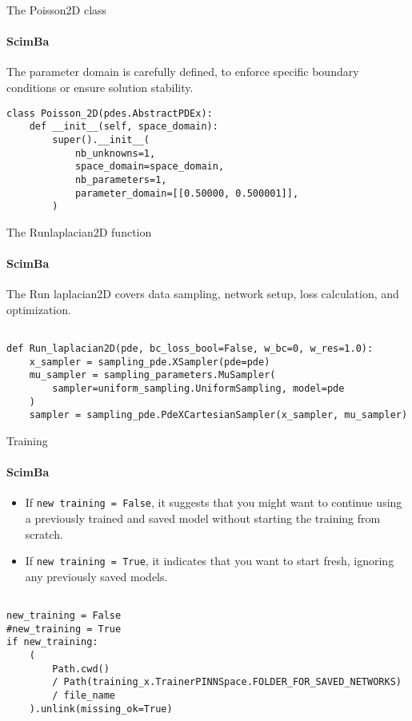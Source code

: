 \documentclass{beamer}
\begin{document}
\begin{comment}
     The class Poisson 2D is a subclass of a predefined "pde" class that defines a problem given a specific domain.
\end{comment}


\begin{frame}[fragile]{The Poisson2D class}
\framesubtitle{ScimBa}

The parameter domain is carefully defined, to enforce specific boundary conditions or ensure solution stability.
\begin{lstlisting}
class Poisson_2D(pdes.AbstractPDEx):
    def __init__(self, space_domain):
        super().__init__(
            nb_unknowns=1,
            space_domain=space_domain,
            nb_parameters=1,
            parameter_domain=[[0.50000, 0.500001]],
        )

\end{lstlisting}

\end{frame}

\begin{comment}
The Run laplacian2D function handles everything from preparing and training a neural network to solving the Laplacian PDE using PINN. 
\end{comment}

\begin{frame}[fragile]{The Runlaplacian2D function }
\framesubtitle{ScimBa}

The Run laplacian2D covers data sampling, network setup, loss calculation, and optimization.
\begin{lstlisting}

def Run_laplacian2D(pde, bc_loss_bool=False, w_bc=0, w_res=1.0):
    x_sampler = sampling_pde.XSampler(pde=pde)
    mu_sampler = sampling_parameters.MuSampler(
        sampler=uniform_sampling.UniformSampling, model=pde
    )
    sampler = sampling_pde.PdeXCartesianSampler(x_sampler, mu_sampler)

\end{lstlisting}

\end{frame}
\begin{frame}[fragile]{Training}
\framesubtitle{ScimBa}
\begin{itemize}
    \item If \texttt{new training = False}, it suggests that you might want to continue using a previously trained and saved model without starting the training from scratch.
    \item If \texttt{new training = True}, it indicates that you want to start fresh, ignoring any previously saved models.
\end{itemize}
\begin{lstlisting}

new_training = False
#new_training = True
if new_training:
    (
        Path.cwd()
        / Path(training_x.TrainerPINNSpace.FOLDER_FOR_SAVED_NETWORKS)
        / file_name
    ).unlink(missing_ok=True)
    
\end{lstlisting}

\end{frame}
\end{document}
